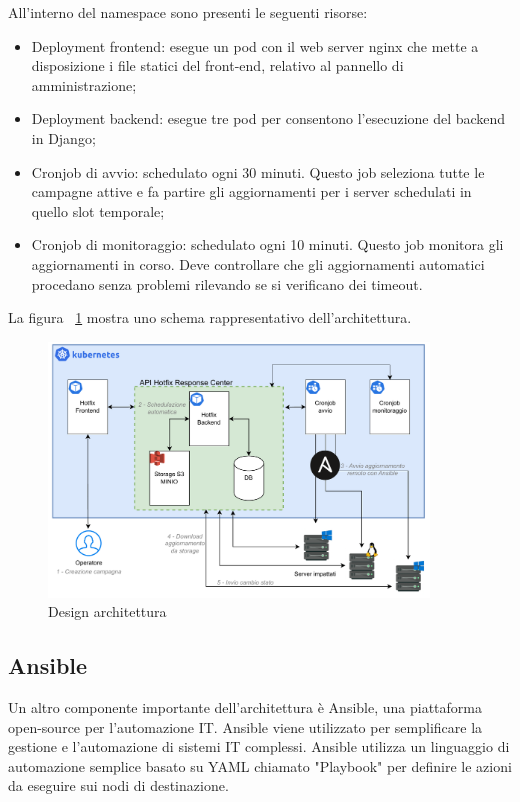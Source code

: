 All’interno del namespace sono presenti le seguenti risorse:
\begin{itemize}
\item Deployment frontend: esegue un pod con il web server nginx che mette a disposizione i file statici del front-end, relativo al pannello di amministrazione;
\item Deployment backend: esegue tre pod per consentono l’esecuzione del backend in Django;
\item Cronjob di avvio: schedulato ogni 30 minuti. Questo job seleziona tutte le campagne attive e fa partire gli aggiornamenti per i server schedulati in quello slot temporale;
\item Cronjob di monitoraggio: schedulato ogni 10 minuti. Questo job monitora gli aggiornamenti in corso. Deve controllare che gli aggiornamenti automatici procedano senza problemi rilevando se si verificano dei timeout.
\end{itemize}

La figura ~\ref{fig:Design architettura} 
mostra uno schema rappresentativo dell’architettura.

\begin{figure}[H]
  \begin{flushright}
    \centering
    \includegraphics[width=0.90\textwidth]{imgs/architecture_design.pdf}
    \caption{Design architettura}
    \label{fig:Design architettura}
  \end{flushright}
\end{figure}


\subsection{Ansible}
Un altro componente importante dell’architettura è Ansible, una piattaforma 
open-source per l'automazione IT. Ansible viene utilizzato per semplificare 
la gestione e l'automazione di sistemi IT complessi. Ansible utilizza un 
linguaggio di automazione semplice basato su YAML chiamato "Playbook" per 
definire le azioni da eseguire sui nodi di destinazione.\\

